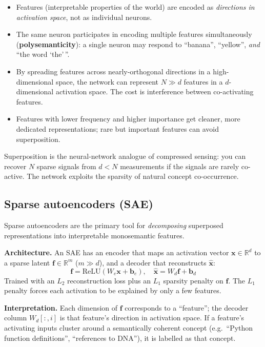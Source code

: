 \begin{itemize}
  \item Features (interpretable properties of the world) are encoded as \emph{directions
    in activation space}, not as individual neurons.
  \item The same neuron participates in encoding multiple features simultaneously
    (\textbf{polysemanticity}): a single neuron may respond to ``banana'',
    ``yellow'', \emph{and} ``the word `the'\,''.
  \item By spreading features across nearly-orthogonal directions in a high-dimensional
    space, the network can represent $N \gg d$ features in a $d$-dimensional activation
    space. The cost is interference between co-activating features.
  \item Features with lower frequency and higher importance get cleaner, more
    dedicated representations; rare but important features can avoid superposition.
\end{itemize}

\begin{intuitionbox}
  Superposition is the neural-network analogue of compressed sensing: you can recover
  $N$ sparse signals from $d < N$ measurements if the signals are rarely co-active.
  The network exploits the sparsity of natural concept co-occurrence.
\end{intuitionbox}

\subsection{Sparse autoencoders (SAE)}

Sparse autoencoders are the primary tool for \emph{decomposing} superposed
representations into interpretable monosemantic features.

\textbf{Architecture.} An SAE has an encoder that maps an activation vector
$\mathbf{x} \in \mathbb{R}^d$ to a sparse latent $\mathbf{f} \in \mathbb{R}^m$ ($m \gg d$),
and a decoder that reconstructs $\hat{\mathbf{x}}$:
\[
  \mathbf{f} = \text{ReLU}(W_e \mathbf{x} + \mathbf{b}_e), \quad
  \hat{\mathbf{x}} = W_d \mathbf{f} + \mathbf{b}_d
\]
Trained with an $L_2$ reconstruction loss plus an $L_1$ sparsity penalty on $\mathbf{f}$.
The $L_1$ penalty forces each activation to be explained by only a few features.

\textbf{Interpretation.} Each dimension of $\mathbf{f}$ corresponds to a ``feature'';
the decoder column $W_d[:, i]$ is that feature's direction in activation space.
If a feature's activating inputs cluster around a semantically coherent concept (e.g.\
``Python function definitions'', ``references to DNA''), it is labelled as that concept.

